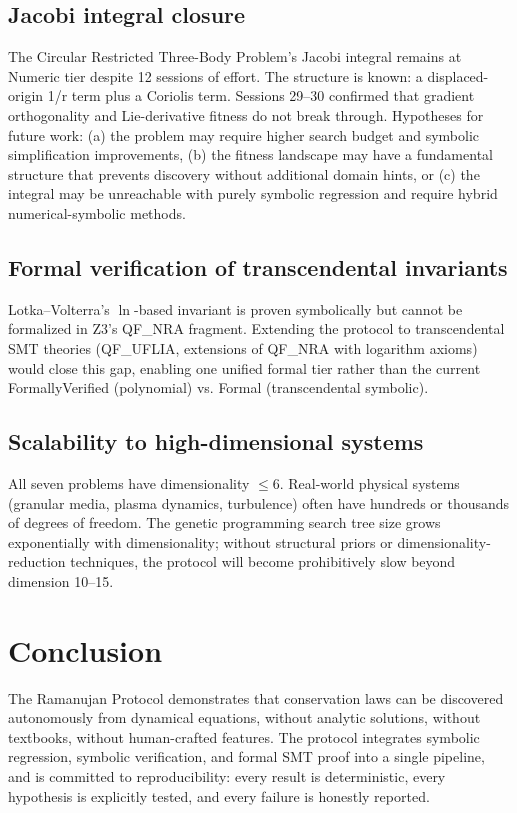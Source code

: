 \subsection{Jacobi integral closure}

The Circular Restricted Three-Body Problem's Jacobi integral remains at Numeric tier despite 12 sessions of effort. The structure is known: a displaced-origin 1/r term plus a Coriolis term. Sessions 29--30 confirmed that gradient orthogonality and Lie-derivative fitness do not break through. Hypotheses for future work: (a) the problem may require higher search budget and symbolic simplification improvements, (b) the fitness landscape may have a fundamental structure that prevents discovery without additional domain hints, or (c) the integral may be unreachable with purely symbolic regression and require hybrid numerical-symbolic methods.

\subsection{Formal verification of transcendental invariants}

Lotka--Volterra's $\ln$-based invariant is proven symbolically but cannot be formalized in Z3's QF\_NRA fragment. Extending the protocol to transcendental SMT theories (QF\_UFLIA, extensions of QF\_NRA with logarithm axioms) would close this gap, enabling one unified formal tier rather than the current FormallyVerified (polynomial) vs. Formal (transcendental symbolic).

\subsection{Scalability to high-dimensional systems}

All seven problems have dimensionality $\leq 6$. Real-world physical systems (granular media, plasma dynamics, turbulence) often have hundreds or thousands of degrees of freedom. The genetic programming search tree size grows exponentially with dimensionality; without structural priors or dimensionality-reduction techniques, the protocol will become prohibitively slow beyond dimension 10--15.

\section{Conclusion}

The Ramanujan Protocol demonstrates that conservation laws can be discovered autonomously from dynamical equations, without analytic solutions, without textbooks, without human-crafted features. The protocol integrates symbolic regression, symbolic verification, and formal SMT proof into a single pipeline, and is committed to reproducibility: every result is deterministic, every hypothesis is explicitly tested, and every failure is honestly reported.

